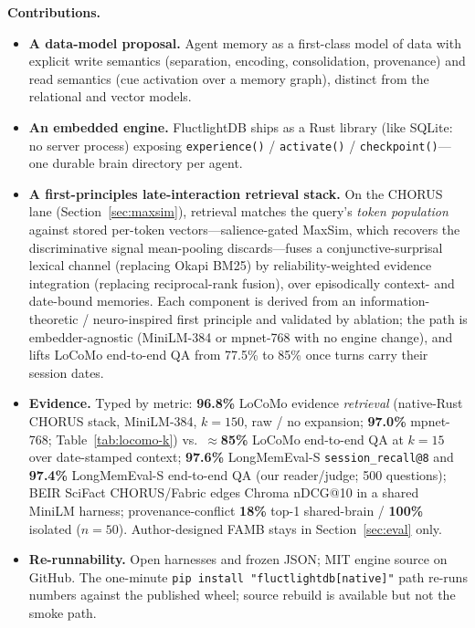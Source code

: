 \documentclass[11pt]{article}
\begin{document}
\textbf{Contributions.}
\begin{itemize}
  \item \textbf{A data-model proposal.} Agent memory as a first-class model of data
  with explicit write semantics (separation, encoding, consolidation, provenance)
  and read semantics (cue activation over a memory graph), distinct from the
  relational and vector models.
  \item \textbf{An embedded engine.} FluctlightDB ships as a Rust library (like SQLite:
  no server process) exposing \texttt{experience()} / \texttt{activate()} /
  \texttt{checkpoint()}---one durable brain directory per agent.
  \item \textbf{A first-principles late-interaction retrieval stack.} On the CHORUS
  lane (Section~\ref{sec:maxsim}), retrieval matches the query's \emph{token
  population} against stored per-token vectors---salience-gated MaxSim, which
  recovers the discriminative signal mean-pooling discards---fuses a
  conjunctive-surprisal lexical channel (replacing Okapi BM25) by
  reliability-weighted evidence integration (replacing reciprocal-rank fusion),
  over episodically context- and date-bound memories. Each component is derived
  from an information-theoretic / neuro-inspired first principle and validated by
  ablation; the path is embedder-agnostic (MiniLM-384 or mpnet-768 with no engine
  change), and lifts LoCoMo end-to-end QA from 77.5\% to 85\% once turns carry
  their session dates.
  \item \textbf{Evidence.} Typed by metric: \textbf{96.8\%} LoCoMo evidence
  \emph{retrieval} (native-Rust CHORUS stack, MiniLM-384, $k{=}150$, raw / no expansion;
  \textbf{97.0\%} mpnet-768; Table~\ref{tab:locomo-k}) vs.\ $\approx$\textbf{85\%} LoCoMo end-to-end
  QA at $k{=}15$ over date-stamped context; \textbf{97.6\%} LongMemEval-S \texttt{session\_recall@8} and
  \textbf{97.4\%} LongMemEval-S end-to-end QA (our reader/judge; 500 questions);
  BEIR SciFact CHORUS/Fabric edges Chroma nDCG@10 in a shared MiniLM harness;
  provenance-conflict \textbf{18\%} top-1 shared-brain / \textbf{100\%} isolated
  ($n{=}50$). Author-designed FAMB stays in Section~\ref{sec:eval} only.
  \item \textbf{Re-runnability.} Open harnesses and frozen JSON; MIT engine source
  on GitHub. The one-minute \texttt{pip install "fluctlightdb[native]"} path
  re-runs numbers against the published wheel; source rebuild is available but
  not the smoke path.
\end{itemize}
\end{document}
